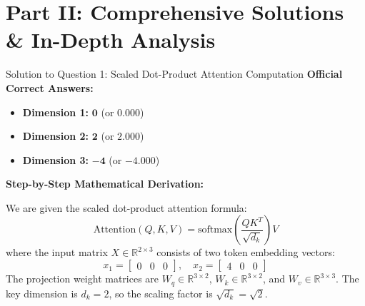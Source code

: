 \documentclass[11pt,a4paper]{article}
\begin{document}
\newpage

\section{Part II: Comprehensive Solutions \& In-Depth Analysis}

\begin{solutionbox}{Solution to Question 1: Scaled Dot-Product Attention Computation}
\textbf{Official Correct Answers:}
\begin{itemize}[leftmargin=2em]
    \item \textbf{Dimension 1:} $\mathbf{0}$ \quad (or $0.000$)
    \item \textbf{Dimension 2:} $\mathbf{2}$ \quad (or $2.000$)
    \item \textbf{Dimension 3:} $\mathbf{-4}$ \quad (or $-4.000$)
\end{itemize}

\medskip
\textbf{Step-by-Step Mathematical Derivation:}

We are given the scaled dot-product attention formula:
\begin{equation}
    \text{Attention}(Q, K, V) = \text{softmax}\left(\frac{Q K^T}{\sqrt{d_k}}\right) V
\end{equation}
where the input matrix $X \in \mathbb{R}^{2 \times 3}$ consists of two token embedding vectors:
\begin{equation}
    x_1 = \begin{bmatrix} 0 & 0 & 0 \end{bmatrix}, \quad x_2 = \begin{bmatrix} 4 & 0 & 0 \end{bmatrix}
\end{equation}
The projection weight matrices are $W_q \in \mathbb{R}^{3 \times 2}$, $W_k \in \mathbb{R}^{3 \times 2}$, and $W_v \in \mathbb{R}^{3 \times 3}$. The key dimension is $d_k = 2$, so the scaling factor is $\sqrt{d_k} = \sqrt{2}$.


\end{solutionbox}
\end{document}
